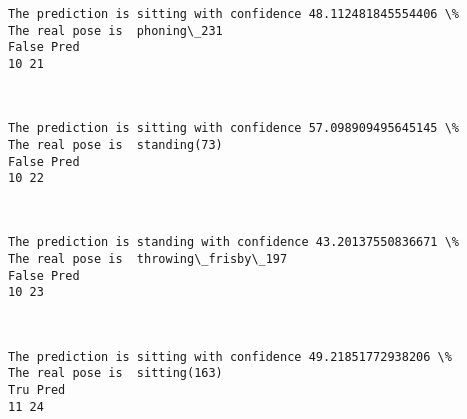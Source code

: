 \documentclass[11pt]{article}
\begin{document}
    \begin{Verbatim}[commandchars=\\\{\}]
The prediction is sitting with confidence 48.112481845554406 \%
The real pose is  phoning\_231
False Pred
10 21

    \end{Verbatim}

    \begin{center}
    \end{center}
    { \hspace*{\fill} \\}
    
    \begin{Verbatim}[commandchars=\\\{\}]
The prediction is sitting with confidence 57.098909495645145 \%
The real pose is  standing(73)
False Pred
10 22

    \end{Verbatim}

    \begin{center}
    \end{center}
    { \hspace*{\fill} \\}
    
    \begin{Verbatim}[commandchars=\\\{\}]
The prediction is standing with confidence 43.20137550836671 \%
The real pose is  throwing\_frisby\_197
False Pred
10 23

    \end{Verbatim}

    \begin{center}
    \end{center}
    { \hspace*{\fill} \\}
    
    \begin{Verbatim}[commandchars=\\\{\}]
The prediction is sitting with confidence 49.21851772938206 \%
The real pose is  sitting(163)
Tru Pred
11 24

    \end{Verbatim}

    \begin{center}
    \end{center}
    { \hspace*{\fill} \\}
    
\end{document}
